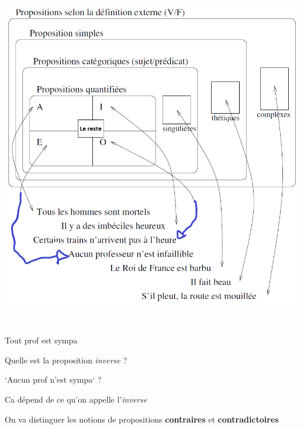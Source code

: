 \begin{frame}
\includegraphics[scale=0.31]{syntheseProps.png}
\end{frame}





\begin{frame}

			\begin{description}[labelindent=6pt,style=multiline,leftmargin=1.3in]
		 \setlength\itemsep{1em}
\item[Inverse \only<5->{?}] \textcolor{white}{lol} 
	 \pause
\item[Exemple] Tout prof est sympa\pause 
\item[] Quelle est la proposition \textit{inverse} ?\pause 
\item[] `Aucun prof n'est sympa` ?\pause 
\item[] Ca dépend de ce qu'on appelle l'\textit{inverse}\pause
\item[] On va distinguer les notions de propositions \textbf{contraires} et \textbf{contradictoires}
	\end{description}
	
\end{frame}



